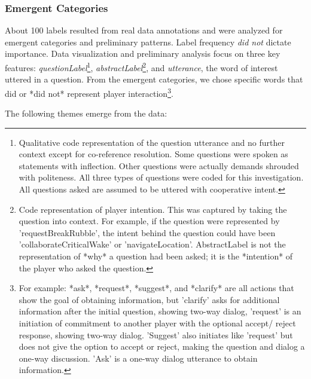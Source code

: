 \subsubsection{Emergent Categories}

About 100 labels resulted from real data annotations and were analyzed for
emergent categories and preliminary patterns. Label frequency \emph{did not}
dictate importance. Data visualization and preliminary analysis focus on three
key features: \emph{questionLabel}\footnote{Qualitative code representation of the
question utterance and no further context except for co-reference resolution.
Some questions were spoken as statements with inflection. Other questions were
actually demands shrouded with politeness. All three types of questions were
coded for this investigation. All questions asked are assumed to be uttered
with cooperative intent.}, \emph{abstractLabel}\footnote{Code representation of
player intention. This was captured by taking the question into context. For
example, if the question were represented by 'requestBreakRubble', the intent
behind the question could have been 'collaborateCriticalWake' or
'navigateLocation'. AbstractLabel is not the representation of *why* a
question had been asked; it is the *intention* of the player who asked the
question.}, and \emph{utterance}, the word of interest uttered in a question. From
the emergent categories, we chose specific words that did or *did not*
represent player interaction\footnote{For example: *ask*, *request*,
*suggest*, and *clarify* are all actions that show the goal of
obtaining information, but 'clarify' asks for additional information after the
initial question, showing two-way dialog, 'request' is an initiation of
commitment to another player with the optional accept/ reject response, showing
two-way dialog. 'Suggest' also initiates like 'request' but does not give the
option to accept or reject, making the question and dialog a one-way
discussion. 'Ask' is a one-way dialog utterance to obtain information.}. 

The following themes emerge from the data:

